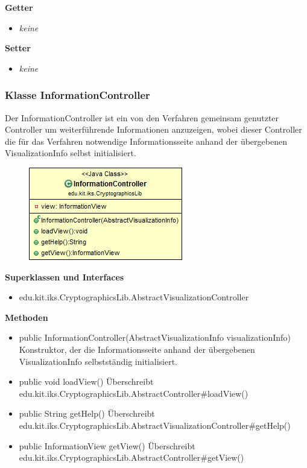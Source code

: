 \documentclass{article}
\begin{document}
      \textbf{Getter}
      \begin{itemize}
		\item \textit{keine}
      \end{itemize}
      
      \textbf{Setter}
      \begin{itemize}
        \item \textit{keine}
      \end{itemize}
	
	\subsubsection{Klasse InformationController}
	  Der InformationController ist ein von den Verfahren gemeinsam genutzter
	  Controller um weiterführende Informationen anzuzeigen, wobei dieser Controller
	  die für das Verfahren notwendige Informationsseite anhand der übergebenen VisualizationInfo
	  selbst initialisiert.
	
      \begin{figure}[H]
        \centering
        \includegraphics{resources/edu-kit-iks-CryptographicsLib-InformationController}
      \end{figure}
	
      \textbf{Superklassen und Interfaces}
      \begin{itemize}
        \item edu.kit.iks.CryptographicsLib.AbstractVisualizationController
      \end{itemize}
	
      \textbf{Methoden}
      \begin{itemize}
        \item public InformationController(AbstractVisualizationInfo visualizationInfo) \newline
          Konstruktor, der die Informationsseite anhand der übergebenen VisualizationInfo
          selbstständig initialisiert.
		\item public void loadView() \newline
		  Überschreibt edu.kit.iks.CryptographicsLib.AbstractController\#loadView()
		\item public String getHelp() \newline
		  Überschreibt edu.kit.iks.CryptographicsLib.AbstractVisualizationController\#getHelp()
		\item public InformationView getView() \newline
		  Überschreibt edu.kit.iks.CryptographicsLib.AbstractController\#getView()
      \end{itemize}
      
\end{document}

